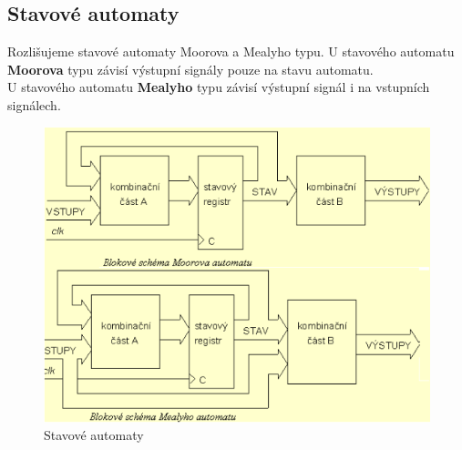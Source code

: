 \subsection{Stavové automaty}
Rozlišujeme stavové automaty Moorova a Mealyho typu. 
U stavového automatu \textbf{Moorova} typu závisí výstupní signály pouze na stavu automatu.\\
U stavového automatu \textbf{Mealyho} typu závisí výstupní signál i na vstupních signálech.\\
   \begin{figure}[h]
   \begin{center}
     \includegraphics[scale=0.6]{images/Moor.png}
   \end{center}
   \caption{Stavové automaty}
  \end{figure}  



















